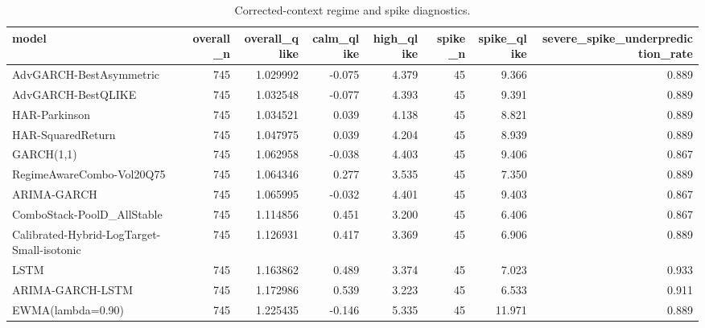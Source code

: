 \begin{table}[!t]
\centering
\caption{Corrected-context regime and spike diagnostics.}
\label{tab:regime-spike-corrected-neural}
\scriptsize
\begin{tabular}{@{}lrrrrrrr@{}}
\toprule
model & overall\_n & overall\_qlike & calm\_qlike & high\_qlike & spike\_n & spike\_qlike & severe\_spike\_underprediction\_rate \\
\midrule
AdvGARCH-BestAsymmetric & 745 & 1.029992 & -0.075 & 4.379 & 45 & 9.366 & 0.889 \\
AdvGARCH-BestQLIKE & 745 & 1.032548 & -0.077 & 4.393 & 45 & 9.391 & 0.889 \\
HAR-Parkinson & 745 & 1.034521 & 0.039 & 4.138 & 45 & 8.821 & 0.889 \\
HAR-SquaredReturn & 745 & 1.047975 & 0.039 & 4.204 & 45 & 8.939 & 0.889 \\
GARCH(1,1) & 745 & 1.062958 & -0.038 & 4.403 & 45 & 9.406 & 0.867 \\
RegimeAwareCombo-Vol20Q75 & 745 & 1.064346 & 0.277 & 3.535 & 45 & 7.350 & 0.889 \\
ARIMA-GARCH & 745 & 1.065995 & -0.032 & 4.401 & 45 & 9.403 & 0.867 \\
ComboStack-PoolD\_AllStable & 745 & 1.114856 & 0.451 & 3.200 & 45 & 6.406 & 0.867 \\
Calibrated-Hybrid-LogTarget-Small-isotonic & 745 & 1.126931 & 0.417 & 3.369 & 45 & 6.906 & 0.889 \\
LSTM & 745 & 1.163862 & 0.489 & 3.374 & 45 & 7.023 & 0.933 \\
ARIMA-GARCH-LSTM & 745 & 1.172986 & 0.539 & 3.223 & 45 & 6.533 & 0.911 \\
EWMA(lambda=0.90) & 745 & 1.225435 & -0.146 & 5.335 & 45 & 11.971 & 0.889 \\
\bottomrule
\end{tabular}
\end{table}
